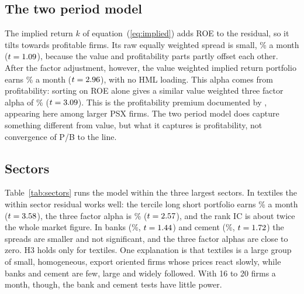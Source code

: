 \documentclass[11pt]{article}
\begin{document}
\subsection{The two period model}

The implied return $k$ of equation~(\ref{eq:implied}) adds ROE to the residual, so it tilts towards
profitable firms. Its raw equally weighted spread is small, \Kew{}\% a month ($t = 1.09{}$), because
the value and profitability parts partly offset each other. After the factor adjustment, however, the
value weighted implied return portfolio earns \Kvwff{}\% a month ($t = 2.96{}$), with no HML
loading. This alpha comes from profitability: sorting on ROE alone gives a similar value weighted
three factor alpha of \ROEvwff{}\% ($t = 3.09{}$). This is the profitability premium documented
by \citet{famafrench2006}, appearing here among larger PSX firms. The two period model does capture
something different from value, but what it captures is profitability, not convergence of P/B to the
line.

\subsection{Sectors}

Table~\ref{tab:sectors} runs the model within the three largest sectors. In textiles the within
sector residual works well: the tercile long short portfolio earns \TEXew{}\% a month ($t =
3.58{}$), the three factor alpha is \TEXff{}\% ($t = 2.57{}$), and the rank IC is about twice
the whole market figure. In banks (\BANKew{}\%, $t = 1.44{}$) and cement (\CEMew{}\%, $t =
1.72{}$) the spreads are smaller and not significant, and the three factor alphas are close to zero. H3 holds only
for textiles. One explanation is that textiles is a large group of small, homogeneous, export
oriented firms whose prices react slowly, while banks and cement are few, large and widely followed.
With 16 to 20 firms a month, though, the bank and cement tests have little power.

\begin{table}[htbp]
\centering\small
\caption{Within sector tests. Residuals come from a separate regression of ln(P/B) on ROE inside each
sector each month; portfolios are terciles. Firms is the average number of firms per month. LS mean
and 3F $\alpha$ in percent per month. Rank IC is the average monthly Spearman correlation between
the cheapness score and next month return.}
\label{tab:sectors}

\end{table}
\end{document}
